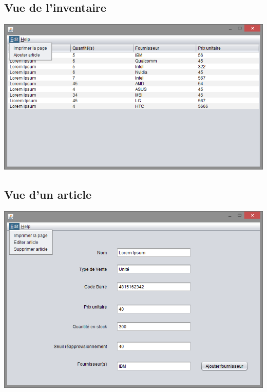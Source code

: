 \subsection{Vue de l'inventaire}
\begin{center}
	\includegraphics[width=14cm]{InventaireView.png}
\end{center}

\subsection{Vue d'un article}
\begin{center}
	\includegraphics[width=14cm]{ArticleView.png}
\end{center}

